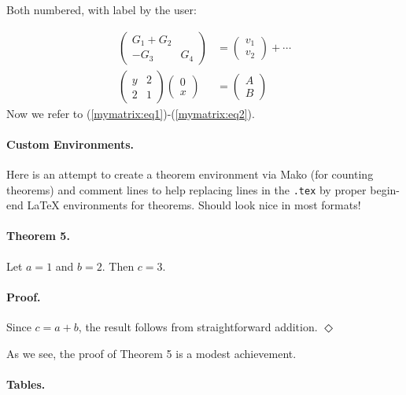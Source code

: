 \documentclass[%
oneside,                 %
final,                   %
10pt]{article}
\theoremstyle{definition}
\begin{document}
\begin{enumerate}
Both numbered, with label by the user:

\begin{align}
\begin{pmatrix}
G_1 + G_2\\ 
-G_3 & G_4
\end{pmatrix}
&=
\begin{pmatrix}
 v_1 \\ 
 v_2
\end{pmatrix}
+ \cdots \label{mymatrix:eq1}
\\ 
\label{mymatrix:eq2}
\left(\begin{array}{ll}
y & 2\\ 
2 & 1
\end{array}\right)
\left(\begin{array}{ll}
0 \\ x
\end{array}\right)
&= \begin{pmatrix}
A \\ B
\end{pmatrix}
\end{align}
Now we refer to (\ref{mymatrix:eq1})-(\ref{mymatrix:eq2}).

\paragraph{Custom Environments.}
Here is an attempt to create a theorem environment via Mako
(for counting theorems) and comment lines to help replacing lines in
the \texttt{.tex} by proper begin-end {\LaTeX} environments for theorems.
Should look nice in most formats!

\label{theorem:fundamental1}

\paragraph{Theorem 5.}
Let $a=1$ and $b=2$. Then $c=3$.

\paragraph{Proof.}
Since $c=a+b$, the result follows from straightforward addition.
$\Diamond$

As we see, the proof of Theorem 5 is a modest
achievement.

\paragraph{Tables.}
\label{subsec:table}


\end{enumerate}
\end{document}
